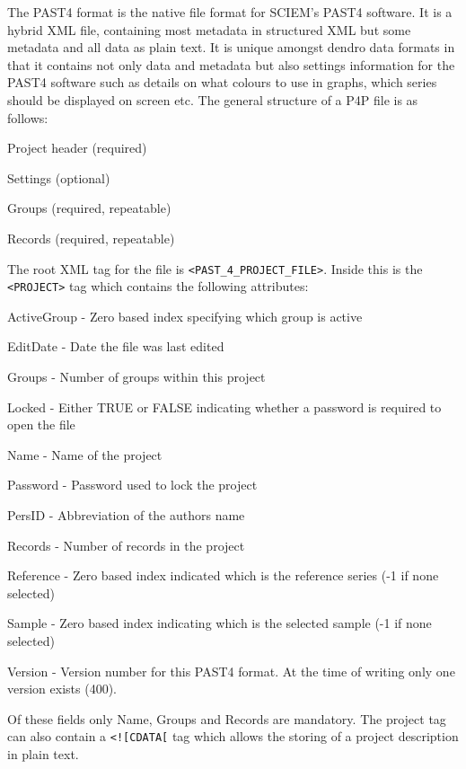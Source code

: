 The PAST4 format is the native file format for SCIEM's PAST4 software. It is a hybrid XML file, containing most metadata in structured XML but some metadata and all data as plain text. It is unique amongst dendro data formats in that it contains not only data and metadata but also settings information for the PAST4 software such as details on what colours to use in graphs, which series should be displayed on screen etc. The general structure of a P4P file is as follows:

\begin{itemize*}
    \item  Project header (required)
    \item  Settings (optional)
    \item  Groups (required, repeatable)
    \item  Records (required, repeatable) 
\end{itemize*}


The root XML tag for the file is \verb|<PAST_4_PROJECT_FILE>|. Inside this is the \verb|<PROJECT>| tag which contains the following attributes:

\begin{itemize*}
    \item  ActiveGroup - Zero based index specifying which group is active
    \item  EditDate - Date the file was last edited
    \item  Groups - Number of groups within this project
    \item  Locked - Either TRUE or FALSE indicating whether a password is required to open the file
    \item  Name - Name of the project
    \item  Password - Password used to lock the project
    \item  PersID - Abbreviation of the authors name
    \item  Records - Number of records in the project
    \item  Reference - Zero based index indicated which is the reference series (-1 if none selected)
    \item  Sample - Zero based index indicating which is the selected sample (-1 if none selected)
    \item  Version - Version number for this PAST4 format. At the time of writing only one version exists (400). 
\end{itemize*}

Of these fields only Name, Groups and Records are mandatory. The project tag can also contain a \verb|<![CDATA[| tag which allows the storing of a project description in plain text.

